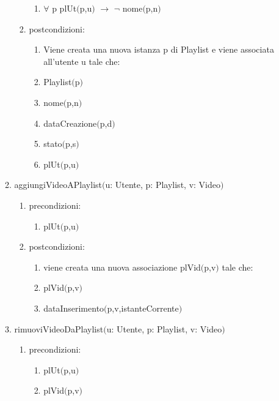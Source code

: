 \documentclass{article}
\begin{document}
\begin{enumerate}
\begin{enumerate}
\begin{enumerate}
            \begin{enumerate}
                \item $\forall$ p plUt$($p,u$)$ $\rightarrow$ $\neg$ nome$($p,n$)$
            \end{enumerate}
            \item postcondizioni:
            \begin{enumerate}
                \item Viene creata una nuova istanza p di Playlist e viene associata all'utente u tale che:
                \item Playlist$($p$)$
                \item nome$($p,n$)$
                \item dataCreazione$($p,d$)$
                \item stato$($p,s$)$
                \item plUt$($p,u$)$
            \end{enumerate}
        \end{enumerate}
        \newpage
        \item aggiungiVideoAPlaylist$($u: Utente, p: Playlist, v: Video$)$
        \begin{enumerate}
            \item precondizioni:
            \begin{enumerate}
                \item plUt$($p,u$)$
            \end{enumerate}
            \item postcondizioni:
            \begin{enumerate}
                \item viene creata una nuova associazione plVid$($p,v$)$ tale che:
                \item plVid$($p,v$)$
                \item dataInserimento$($p,v,istanteCorrente$)$
            \end{enumerate}
        \end{enumerate}
        \newpage
        \item rimuoviVideoDaPlaylist$($u: Utente, p: Playlist, v: Video$)$
        \begin{enumerate}
            \item precondizioni:
            \begin{enumerate}
                \item plUt$($p,u$)$
                \item plVid$($p,v$)$

\end{enumerate}
\end{enumerate}
\end{enumerate}
\end{enumerate}
\end{document}
